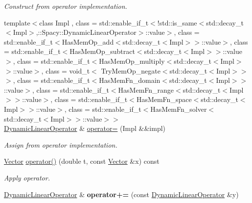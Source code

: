 \begin{DoxyCompactItemize}
\begin{DoxyCompactList}\small\item\em Construct from operator implementation. \end{DoxyCompactList}\item 
\hypertarget{classSpacy_1_1DynamicLinearOperator_af6c6b3d3cfee8b286453a233db5b029a}{}{\footnotesize template$<$class Impl , class  = std\+::enable\+\_\+if\+\_\+t$<$!std\+::is\+\_\+same$<$std\+::decay\+\_\+t$<$\+Impl$>$,\+::\+Spacy\+::\+Dynamic\+Linear\+Operator$>$\+::value$>$, class  = std\+::enable\+\_\+if\+\_\+t$<$\+Has\+Mem\+Op\+\_\+add$<$std\+::decay\+\_\+t$<$\+Impl$>$$>$\+::value$>$, class  = std\+::enable\+\_\+if\+\_\+t$<$\+Has\+Mem\+Op\+\_\+subtract$<$std\+::decay\+\_\+t$<$\+Impl$>$$>$\+::value$>$, class  = std\+::enable\+\_\+if\+\_\+t$<$\+Has\+Mem\+Op\+\_\+multiply$<$std\+::decay\+\_\+t$<$\+Impl$>$$>$\+::value$>$, class  = void\+\_\+t$<$ Try\+Mem\+Op\+\_\+negate$<$std\+::decay\+\_\+t$<$\+Impl$>$$>$ $>$, class  = std\+::enable\+\_\+if\+\_\+t$<$\+Has\+Mem\+Fn\+\_\+domain$<$std\+::decay\+\_\+t$<$\+Impl$>$$>$\+::value$>$, class  = std\+::enable\+\_\+if\+\_\+t$<$\+Has\+Mem\+Fn\+\_\+range$<$std\+::decay\+\_\+t$<$\+Impl$>$$>$\+::value$>$, class  = std\+::enable\+\_\+if\+\_\+t$<$\+Has\+Mem\+Fn\+\_\+space$<$std\+::decay\+\_\+t$<$\+Impl$>$$>$\+::value$>$, class  = std\+::enable\+\_\+if\+\_\+t$<$\+Has\+Mem\+Fn\+\_\+solver$<$std\+::decay\+\_\+t$<$\+Impl$>$$>$\+::value$>$$>$ }\\\hyperlink{classSpacy_1_1DynamicLinearOperator}{Dynamic\+Linear\+Operator} \& \hyperlink{classSpacy_1_1DynamicLinearOperator_af6c6b3d3cfee8b286453a233db5b029a}{operator=} (Impl \&\&impl)\label{classSpacy_1_1DynamicLinearOperator_af6c6b3d3cfee8b286453a233db5b029a}

\begin{DoxyCompactList}\small\item\em Assign from operator implementation. \end{DoxyCompactList}\item 
\hypertarget{classSpacy_1_1DynamicLinearOperator_a436759e2a2a59d57127e317d6b809349}{}\hyperlink{classSpacy_1_1Vector}{Vector} \hyperlink{classSpacy_1_1DynamicLinearOperator_a436759e2a2a59d57127e317d6b809349}{operator()} (double t, const \hyperlink{classSpacy_1_1Vector}{Vector} \&x) const \label{classSpacy_1_1DynamicLinearOperator_a436759e2a2a59d57127e317d6b809349}

\begin{DoxyCompactList}\small\item\em Apply operator. \end{DoxyCompactList}\item 
\hypertarget{classSpacy_1_1DynamicLinearOperator_a6696204e09787916f1dec88319fdcdb2}{}\hyperlink{classSpacy_1_1DynamicLinearOperator}{Dynamic\+Linear\+Operator} \& {\bfseries operator+=} (const \hyperlink{classSpacy_1_1DynamicLinearOperator}{Dynamic\+Linear\+Operator} \&y)\label{classSpacy_1_1DynamicLinearOperator_a6696204e09787916f1dec88319fdcdb2}


\end{DoxyCompactItemize}
